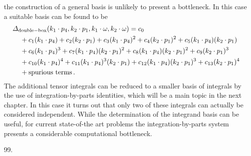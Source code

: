 the construction of a general basis is unlikely to present a
bottleneck. In this case a suitable basis can be found to be~\cite{ch3_Badger:2012dp}
\begin{align}
& \Delta_{\rm double-box}(k_1\cdot p_4, k_2\cdot p_1, k_1\cdot\omega, k_2\cdot\omega) =
    c_0 \nonumber\\
    & \hspace{0.4cm}
    + c_1 (k_1\cdot p_4)
    + c_2 (k_2\cdot p_1)
    + c_3 (k_1\cdot p_4)^2
    + c_4 (k_2\cdot p_1)^2
    + c_5 (k_1\cdot p_4)(k_2\cdot p_1)\nonumber\\
    & \hspace{0.4cm}
    + c_6 (k_1\cdot p_4)^3
    + c_7 (k_1\cdot p_4)(k_2\cdot p_1)^2
    + c_8 (k_1\cdot p_4)(k_2\cdot p_1)^2
    + c_9 (k_2\cdot p_1)^3\nonumber\\
    & \hspace{0.4cm}
    + c_{10} (k_1\cdot p_4)^4
    + c_{11} (k_1\cdot p_4)^3 (k_2\cdot p_1)
    + c_{12} (k_1\cdot p_4) (k_2\cdot p_1)^3
    + c_{13} (k_2\cdot p_1)^4 \nonumber\\
    & \hspace{0.4cm}
    + \text{spurious terms} \,.
\end{align}
The additional tensor integrals can be reduced to a smaller basis of integrals
by the use of integration-by-parts identities, which will be a main topic in the
next chapter. In this case it turns out that only two of these integrals can
actually be considered independent. While the determination of
the integrand basis can be useful, for current state-of-the art problems the
integration-by-parts system presents a considerable computational bottleneck.

\begin{thebibliography}{99.}

\end{thebibliography}
